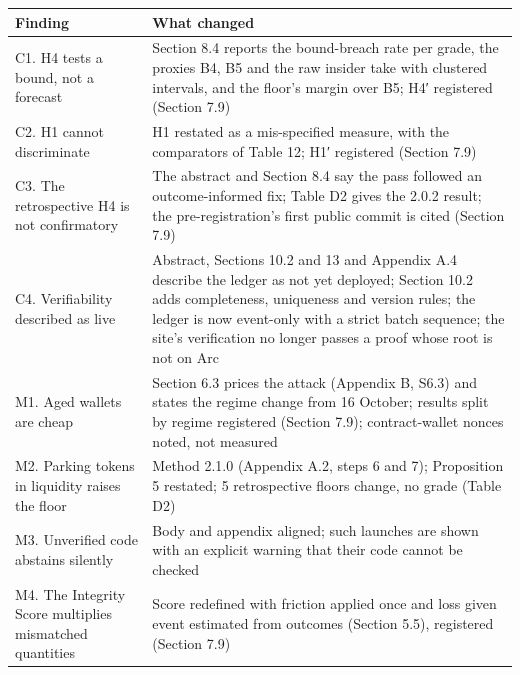 {\def\LTcaptype{none} %
\begin{longtable}[]{@{}
  >{\raggedright\arraybackslash}p{}
  >{\raggedright\arraybackslash}p{}@{}}
\toprule\noalign{}
\begin{minipage}[b]{\linewidth}\raggedright
Finding
\end{minipage} & \begin{minipage}[b]{\linewidth}\raggedright
What changed
\end{minipage} \\
\midrule\noalign{}
\endhead
\bottomrule\noalign{}
\endlastfoot
C1. H4 tests a bound, not a forecast & Section 8.4 reports the bound-breach rate per grade, the proxies B4, B5 and the raw insider take with clustered intervals, and the floor's margin over B5; H4′ registered (Section 7.9) \\
C2. H1 cannot discriminate & H1 restated as a mis-specified measure, with the comparators of Table 12; H1′ registered (Section 7.9) \\
C3. The retrospective H4 is not confirmatory & The abstract and Section 8.4 say the pass followed an outcome-informed fix; Table D2 gives the 2.0.2 result; the pre-registration's first public commit is cited (Section 7.9) \\
C4. Verifiability described as live & Abstract, Sections 10.2 and 13 and Appendix A.4 describe the ledger as not yet deployed; Section 10.2 adds completeness, uniqueness and version rules; the ledger is now event-only with a strict batch sequence; the site's verification no longer passes a proof whose root is not on Arc \\
M1. Aged wallets are cheap & Section 6.3 prices the attack (Appendix B, S6.3) and states the regime change from 16 October; results split by regime registered (Section 7.9); contract-wallet nonces noted, not measured \\
M2. Parking tokens in liquidity raises the floor & Method 2.1.0 (Appendix A.2, steps 6 and 7); Proposition 5 restated; 5 retrospective floors change, no grade (Table D2) \\
M3. Unverified code abstains silently & Body and appendix aligned; such launches are shown with an explicit warning that their code cannot be checked \\
M4. The Integrity Score multiplies mismatched quantities & Score redefined with friction applied once and loss given event estimated from outcomes (Section 5.5), registered (Section 7.9) \\

\end{longtable}}
